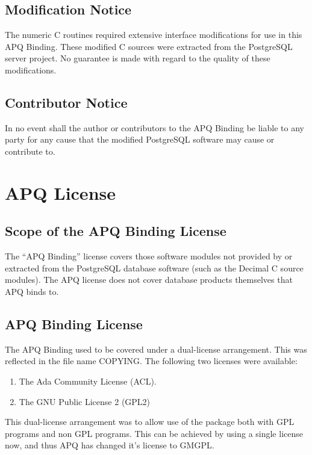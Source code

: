 \documentclass[english,letterpaper]{book}
\begin{document}
\section*{Modification Notice}

The numeric C routines required extensive interface modifications
for use in this APQ Binding. These modified C sources were extracted
from the PostgreSQL server project. No guarantee is made with regard
to the quality of these modifications.


\section*{Contributor Notice}

In no event shall the author or contributors to the APQ Binding be
liable to any party for any cause that the modified PostgreSQL software
may cause or contribute to.


\chapter{APQ License}


\section*{Scope of the APQ Binding License}

The {}``APQ Binding'' license covers those software modules not
provided by or extracted from the PostgreSQL database software (such
as the Decimal C source modules). The APQ license does not cover database
products themselves that APQ binds to.


\section*{APQ Binding License}

The APQ Binding used to be covered under a dual-license arrangement. This
was reflected in the file name COPYING. The following two licenses
were available:

\begin{enumerate}
   \item The Ada Community License (ACL).
   \item The GNU Public License 2 (GPL2)
\end{enumerate}

This dual-license arrangement was to allow use of the package both with GPL programs
and non GPL programs. This can be achieved by using a single license now, and thus APQ
has changed it's license to GMGPL.
\end{document}

